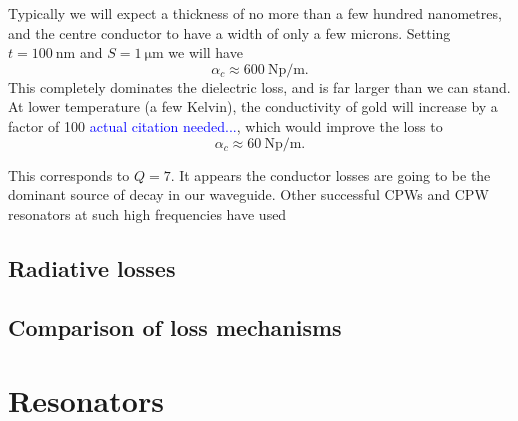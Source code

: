 \documentclass[a4paper]{article}
\newcommand{\cm}[1]{\textcolor{blue}{#1}} %
\begin{document}
Typically we will expect a thickness of no more than a few hundred nanometres,
and the centre conductor to have a width of only a few microns. Setting
$t=\SI{100}{\nano\metre}$ and $S=\SI{1}{\micro\metre}$ we will have
\begin{equation}
  \alpha_c \approx \SI{600}{\neper \per \meter}.
\end{equation}
This completely dominates the dielectric loss, and is far larger than we can
stand. At lower temperature (a few Kelvin), the conductivity of gold will
increase by a factor of 100 \cm{actual citation needed...}, which would improve
the loss to
\begin{equation}
  \alpha_c \approx \SI{60}{\neper \per \meter}.
\end{equation}

This corresponds to $Q=7$. It appears the conductor losses are going to be the
dominant source of decay in our waveguide. Other successful CPWs and CPW
resonators at such high frequencies have used 




\subsection{Radiative losses}

\subsection{Comparison of loss mechanisms}

\section{Resonators}




\end{document}
